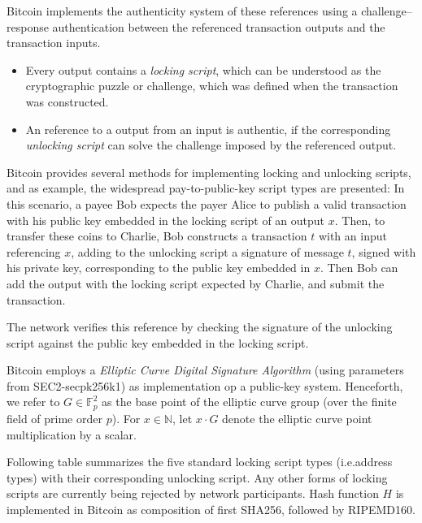 \documentclass[a4paper,11pt,titlepage]{scrbook}
\begin{document}
Bitcoin implements the authenticity system of these references using a challenge–response authentication between the referenced transaction outputs and the transaction inputs.

\begin{itemize}
    \item Every output contains a \emph{locking script}, which can be understood as the cryptographic puzzle or challenge, which was defined when the transaction was constructed.
    \item An reference to a output from an input is authentic, if the corresponding \emph{unlocking script} can solve the challenge imposed by the referenced output.
\end{itemize}

Bitcoin provides several methods for implementing locking and unlocking scripts, and as example, the widespread pay-to-public-key script types are presented: In this scenario, a payee Bob expects the payer Alice to publish a valid transaction with his public key embedded in the locking script of an output $x$.
Then, to transfer these coins to Charlie, Bob constructs a transaction $t$ with an input referencing $x$, adding to the unlocking script a signature of message $t$, signed with his private key, corresponding to the public key embedded in $x$.
Then Bob can add the output with the locking script expected by Charlie, and submit the transaction.


The network verifies this reference by checking the signature of the unlocking script against the public key embedded in the locking script.


Bitcoin employs a \emph{Elliptic Curve Digital Signature Algorithm} (using parameters from SEC2-secpk256k1) as implementation op a public-key system.
Henceforth, we refer to $G\in \mathbb{F}_p^2$ as the base point of the elliptic curve group (over the finite field of prime order $p$). For $x\in \mathbb{N}$, let $x\cdot G$ denote the elliptic curve point multiplication by a scalar.

Following table summarizes the five standard locking script types (i.e.\@ address types) with their corresponding unlocking script. Any other forms of locking scripts are currently being rejected by network participants.
Hash function $H$ is implemented in Bitcoin as composition of first SHA256, followed by RIPEMD160.
\end{document}
